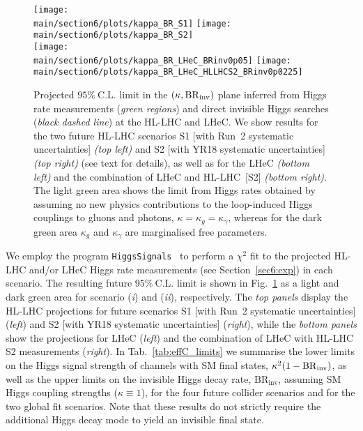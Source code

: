 \documentclass[../report.tex]{subfiles}
\providecommand{\main}{..}
\begin{document}
\begin{figure}
\centering
\texttt{[image: \\main/section6/plots/kappa\_BR\_S1]}
\hfill
\texttt{[image: \\main/section6/plots/kappa\_BR\_S2]}\\
\texttt{[image: \\main/section6/plots/kappa\_BR\_LHeC\_BRinv0p05]}
\hfill
\texttt{[image: \\main/section6/plots/kappa\_BR\_LHeC\_HLLHCS2\_BRinv0p0225]}
\caption{Projected $95\%~\mathrm{C.L.}$ limit in the $(\kappa, \mathrm{BR}_\mathrm{inv})$ plane inferred from Higgs rate measurements (\emph{green regions}) and direct invisible Higgs searches (\emph{black dashed line}) at the HL-LHC and LHeC. We show results for the two future HL-LHC scenarios S1 [with Run~2 systematic uncertainties] {\sl (top left)} and S2 [with YR18 systematic uncertainties] {\sl (top right)} (see text for details), as well as for the LHeC {\sl (bottom left)} and the combination of LHeC and HL-LHC~[S2] {\sl (bottom right)}. The light green area shows the limit from Higgs rates obtained by assuming no new physics contributions to the loop-induced Higgs couplings to gluons and photons, $\kappa = \kappa_g = \kappa_\gamma$, whereas for the dark green area $\kappa_g$ and $\kappa_\gamma$ are marginalised free parameters.}
\label{fig:effC}
\end{figure}

We employ the program \texttt{HiggsSignals}~\cite{Bechtle:2013xfa,Bechtle:2014ewa} to perform a $\chi^2$ fit to the projected HL-LHC {and/or LHeC} Higgs rate measurements (see Section~\ref{sec6:exp})  in each scenario. The resulting future $95\%~\mathrm{C.L.}$ limit is shown in Fig.~\ref{fig:effC} as a light and dark green area for scenario (\emph{i}) and (\emph{ii}), respectively. {The \emph{top panels} display the HL-LHC projections for future scenarios S1 [with Run~2 systematic uncertainties] (\emph{left}) and S2 [with YR18 systematic uncertainties] (\emph{right}), while the \emph{bottom panels} show the projections for LHeC (\emph{left}) and the combination of LHeC with HL-LHC S2 measurements (\emph{right}).} {In Tab.~\ref{tab:effC_limits} we summarise the lower limits on the Higgs signal strength of channels with SM final states, $\kappa^2 (1-\mathrm{BR}_\mathrm{inv})$, as well as the upper limits on the invisible Higgs decay rate, $\mathrm{BR}_\text{inv}$, assuming SM Higgs coupling strengths ($\kappa \equiv 1$), for the four future collider scenarios and for the two global fit scenarios.} Note that these results do not strictly require the additional Higgs decay mode to yield an invisible final state.
\end{document}
